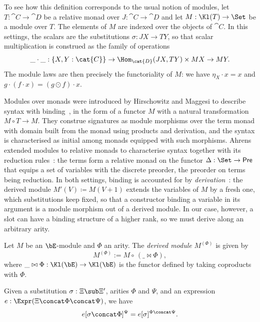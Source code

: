 \begin{remark}
    To see how this definition corresponds to the usual notion of modules, let $T : \cat{C} \to \cat{D}$ be a relative monad over $J : \cat{C} \to \cat{D}$ and let $M : \Kl(T) \to \Set$ be a module over $T$. The elements of $M$ are indexed over the objects of $\cat{C}$. In this settings, the scalars are the substitutions $\sigma : JX \to TY$, so that scalar multiplication is construed as the family of operations
    $$\_\cdot\_ : \{X,Y : \cat{C}\} \to \Hom_{\cat{D}}(JX,TY) \times MX \to MY.$$
    The module laws are then precisely the functoriality of $M$: we have $\eta_X\cdot x = x$ and $g \cdot (f \cdot x) = (g \odot f) \cdot x$. 
\end{remark}

Modules over monads were introduced by Hirschowitz and Maggesi to describe syntax with binding~\cite{HirschowitzMaggesi2007}, in the form of a functor $M$ with a natural transformation $M \circ T \to M$. They construe signatures as module morphisms over the term monad with domain built from the monad using products and derivation, and the syntax is characterised as initial among monads equipped with such morphisms. Ahrens extended modules to relative monads to characterise syntax together with its reduction rules~\cite{Ahrens2016}: the terms form a relative monad on the functor $\Delta : \Set \to \mathsf{Pre}$ that equips a set of variables with the discrete preorder, the preorder on terms being reduction. In both settings, binding is accounted for by \emph{derivation}~\cite[Def.~8]{HirschowitzMaggesi2007}\cite[Def.~25]{Ahrens2016}: the derived module $M'(V) \coloneqq M(V + 1)$ extends the variables of $M$ by a fresh one, which substitutions keep fixed, so that a constructor binding a variable in its argument is a module morphism out of a derived module. In our case, however, a slot can have a binding structure of a higher rank, so we must derive along an arbitrary arity.

\begin{definition}\label{def:derived-module}
    Let $M$ be an $\bE$-module and $\Phi$ an arity. The \emph{derived module} $M^{(\Phi)}$ is given by
    $$M^{(\Phi)} := M \circ\, (\_\bowtie\Phi),$$
    where $\_\bowtie\Phi : \Kl(\bE) \to \Kl(\bE)$ is the functor defined by taking coproducts with $\Phi$.
\end{definition}

\begin{lemma}\label{lem:depth-derived}
    Given a substitution $\sigma : \Xi \sub \Xi'$, arities $\Phi$ and $\Psi$, and an expression $e : \Expr(\Xi \concat \Phi \concat \Psi)$, we have $$e[\sigma \concat \Phi]^\Psi = e[\sigma]^{\Phi \concat \Psi}.$$
\end{lemma}

